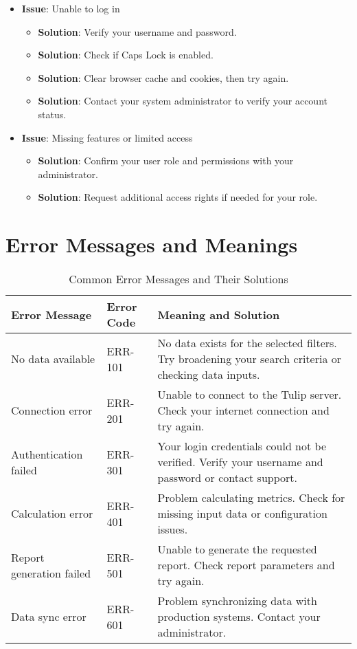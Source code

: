 \documentclass[12pt,a4paper]{report}
\begin{document}
\begin{itemize}
    \item \textbf{Issue}: Unable to log in
    \begin{itemize}
        \item \textbf{Solution}: Verify your username and password.
        \item \textbf{Solution}: Check if Caps Lock is enabled.
        \item \textbf{Solution}: Clear browser cache and cookies, then try again.
        \item \textbf{Solution}: Contact your system administrator to verify your account status.
    \end{itemize}
    
    \item \textbf{Issue}: Missing features or limited access
    \begin{itemize}
        \item \textbf{Solution}: Confirm your user role and permissions with your administrator.
        \item \textbf{Solution}: Request additional access rights if needed for your role.
    \end{itemize}
\end{itemize}

\section{Error Messages and Meanings}

\begin{table}[h]
\centering
\begin{tabular}{p{4cm}p{3cm}p{5cm}}
\toprule
\textbf{Error Message} & \textbf{Error Code} & \textbf{Meaning and Solution} \\
\midrule
No data available & ERR-101 & No data exists for the selected filters. Try broadening your search criteria or checking data inputs. \\
\midrule
Connection error & ERR-201 & Unable to connect to the Tulip server. Check your internet connection and try again. \\
\midrule
Authentication failed & ERR-301 & Your login credentials could not be verified. Verify your username and password or contact support. \\
\midrule
Calculation error & ERR-401 & Problem calculating metrics. Check for missing input data or configuration issues. \\
\midrule
Report generation failed & ERR-501 & Unable to generate the requested report. Check report parameters and try again. \\
\midrule
Data sync error & ERR-601 & Problem synchronizing data with production systems. Contact your administrator. \\
\bottomrule
\end{tabular}
\caption{Common Error Messages and Their Solutions}
\end{table}
\end{document}
